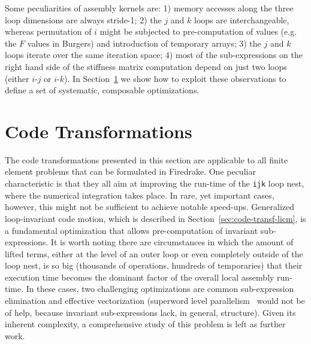 \documentclass[conference]{IEEEtran}
\begin{document}
Some peculiarities of assembly kernels are: 1) memory accesses along the three loop dimensions are always stride-1; 2) the $j$ and $k$ loops are interchangeable, whereas permutation of $i$ might be subjected to pre-computation of values (e.g. the $F$ values in Burgers) and introduction of temporary arrays; 3) the $j$ and $k$ loops iterate over the same iteration space; 4) most of the sub-expressions on the right hand side of the stiffness matrix computation depend on just two loops (either $i$-$j$ or $i$-$k$). In Section~\ref{sec:code-transf} we show how to exploit these observations to define a set of systematic, composable optimizations.


\section{Code Transformations}
\label{sec:code-transf}
The code transformations presented in this section are applicable to all finite element problems that can be formulated in Firedrake. One peculiar characteristic is that they all aim at improving the run-time of the \texttt{ijk} loop nest, where the numerical integration takes place. In rare, yet important cases, however, this might not be sufficient to achieve notable speed-ups. Generalized loop-invariant code motion, which is described in Section~\ref{sec:code-transf-licm}, is a fundamental optimization that allows pre-computation of invariant sub-expressions. It is worth noting there are circumstances in which the amount of lifted terms, either at the level of an outer loop or even completely outside of the loop nest, is so big (thousands of operations, hundreds of temporaries) that their execution time becomes the dominant factor of the overall local assembly run-time. In these cases, two challenging optimizations are common sub-expression elimination and effective vectorization (superword level parallelism~\cite{SLP} would not be of help, because invariant sub-expressions lack, in general, structure). Given its inherent complexity, a comprehensive study of this problem is left as further work.
\end{document}

